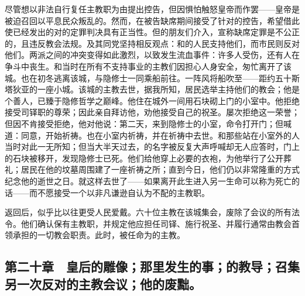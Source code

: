 尽管想以非法自行复任主教职为由提出控告，但因惧怕触怒皇帝而作罢——皇帝是被迫召回以平息民众叛乱的。然而，在被告缺席期间接受了针对的控告，希望借此使已经发出的对的定罪判决具有正当性。但的朋友们介入，宣称缺席定罪是不公正的，且违反教会法规。及其同党坚持相反观点：和的人民支持他们，而市民则反对他们。两派之间的冲突变得如此激烈，以致发生流血事件：许多人受伤，还有人在争斗中丧生。和当时在所有不支持事业的主教们因担心人身安全，匆忙离开了该城。也在初冬逃离该城，与隐修士一同乘船前往。一阵风将船吹至——距约五十斯塔狄亚的一座小城。该城的主教去世，据我所知，居民选举主持他们的教会；他是个善人，已臻于隐修哲学之巅峰。他住在城外一间用石块砌上门的小室中。他拒绝接受司铎职的尊荣；因此亲自拜访他，劝他接受自己的祝圣。屡次拒绝这一荣誉；但因不肯接受拒绝，他对他说：第二天，来到隐修士的小室，命令打开门；但喊道：同意，开始祈祷。也在小室内祈祷，并在祈祷中去世。和那些站在小室外的人当时对此一无所知；但当大半天过去，的名字被反复大声呼喊却无人应答时，门上的石块被移开，发现隐修士已死。他们给他穿上必要的衣袍，为他举行了公开葬礼；居民在他的坟墓周围建了一座祈祷之所；直到今日，他们仍以非常隆重的方式纪念他的逝世之日。就这样去世了——如果离开此生进入另一生命可以称为死亡的话——而不愿接受一个以非凡谦逊自认为不配的主教职。\par

返回后，似乎比以往更受人民爱戴。六十位主教在该城集会，废除了会议的所有法令。他们确认保有主教职，并规定他应担任司铎、施行祝圣、并履行通常由教会首领承担的一切教会职责。此时，被任命为的主教。\par


\subsection{第二十章　皇后的雕像；那里发生的事；的教导；召集另一次反对的主教会议；他的废黜。}


